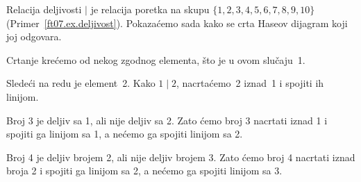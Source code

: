 \begin{EX}\label{ft07.ex.deljivost-1-10}
  Relacija deljivosti $\mid$ je relacija poretka na skupu $\{1, 2, 3, 4, 5, 6, 7, 8, 9, 10\}$
  (Primer~\ref{ft07.ex.deljivost}). Pokaza\'cemo sada kako se crta Haseov dijagram koji joj odgovara.
\end{EX}

\bigskip

\noindent
\begin{minipage}{3in}
  Crtanje kre\'cemo od nekog zgodnog elementa, \v sto je u ovom slu\v caju~1.
\end{minipage}
\hfill
\begin{minipage}{2.5in}
  \begin{center}
    
  \end{center}
\end{minipage}

\bigskip

\noindent
\begin{minipage}{3in}
  Slede\'ci na redu je element~2. Kako $1 \mid 2$, nacrta\'cemo~2 iznad~1 i spojiti ih linijom.
\end{minipage}
\hfill
\begin{minipage}{2.5in}
  \begin{center}
    
  \end{center}
\end{minipage}

\bigskip

\noindent
\begin{minipage}{3in}
  Broj 3 je deljiv sa 1, ali nije deljiv sa 2. Zato \'cemo broj 3 nacrtati iznad 1 i spojiti ga linijom sa 1, a ne\'cemo
  ga spojiti linijom sa 2.
\end{minipage}
\hfill
\begin{minipage}{2.5in}
  \begin{center}
    
  \end{center}
\end{minipage}

\bigskip

\noindent
\begin{minipage}{3in}
  Broj 4 je deljiv brojem 2, ali nije deljiv brojem 3. Zato \'cemo broj 4 nacrtati iznad broja 2 i spojiti ga linijom sa 2, a ne\'cemo
  ga spojiti linijom sa 3.
\end{minipage}
\hfill
\begin{minipage}{2.5in}
  \begin{center}
    
  \end{center}
\end{minipage}

